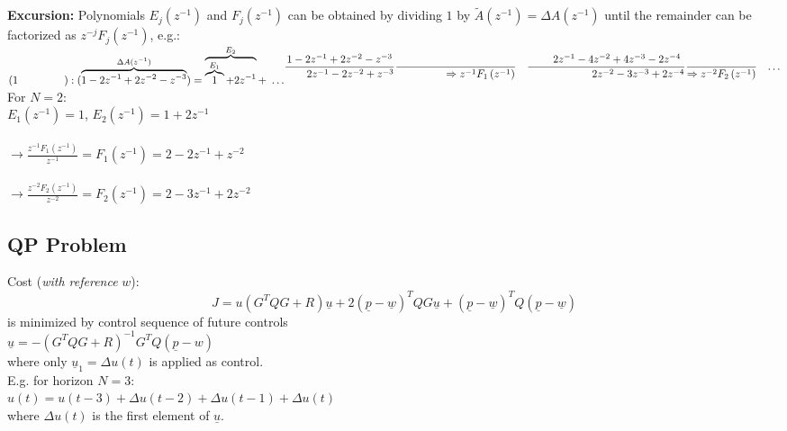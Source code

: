\documentclass[english]{latex4ei/latex4ei_sheet}
\begin{document}
\begin{sectionbox}
\textbf{Excursion:}
Polynomials $E_{j}\left(z^{-1}\right)$ and $F_{j}\left(z^{-1}\right)$ can be obtained by dividing $1$ by $\tilde{A}(z^{-1})=\Delta A(z^{-1})$ until the remainder can be factorized as $z^{-j}F_{j}(z^{-1})$, e.g.:\\
\( \begin{aligned} (1 \qquad \ \qquad):(\overbrace{1-2z^{-1}+2z^{-2}-z^{-3}}^{\Delta A(z^{-1})})=\overbrace{\overbrace{1}^{E_1}+2z^{-1}}^{E_2}+\ \ldots \end{aligned}\\
\begin{aligned}
\frac{1-2 z^{-1}+2 z^{-2}-z^{-3}}{\qquad 2 z^{-1}-2 z^{-2}+z^{-3}} &  \frac{}{\ \ \qquad \qquad \Rightarrow z^{-1} F_{1}\left(z^{-1}\right)}
\end{aligned}\\
\begin{aligned}
\frac{\qquad 2 z^{-1}-4 z^{-2}+4 z^{-3}-2 z^{-4}}{\qquad \qquad \qquad 2z^{-2}- 3z^{-3}+2 z^{-4}} & \frac{}{\Rightarrow z^{-2} F_{2}\left(z^{-1}\right)} & \ldots \end{aligned} \)
\\
For $N=2$:\\
$E_1(z^{-1})=1$, \quad $E_2(z^{-1})=1+2z^{-1}$\\
\\
$\rightarrow\frac{z^{-1}F_1(z^{-1})}{z^{-1}}=F_1(z^{-1})=2 -2z^{-1}+z^{-2}$\\
\\
$\rightarrow\frac{z^{-2}F_2(z^{-1})}{z^{-2}}=F_2(z^{-1})=2 -3z^{-1}+2z^{-2}$\\

\subsection{QP Problem}
Cost (\textit{with reference} $w$): $$J=u\left(G^{T} Q G+R\right) \underline{u}+2(\underline{p}-\underline{w})^{T} Q G \underline{u}+(\underline{p}-\underline{w})^{T} Q(\underline{p}-\underline{w})$$ is minimized by control sequence of future controls \\
$\underline{u}=-\left(G^{T} Q G+R\right)^{-1} G^{T} Q(\underline{p}-w)$\\
where only $\underline{u}_{1}=\Delta u(t)$ is applied as control.
\vspace{0.1cm}\\
E.g. for horizon $N=3$:\\ $u(t)=u(t-3)+\Delta u(t-2)+\Delta u(t-1)+\Delta u(t)$\\
where $\Delta u(t)$ is the first element of $\underline{u}$.

\end{sectionbox}
\end{document}
